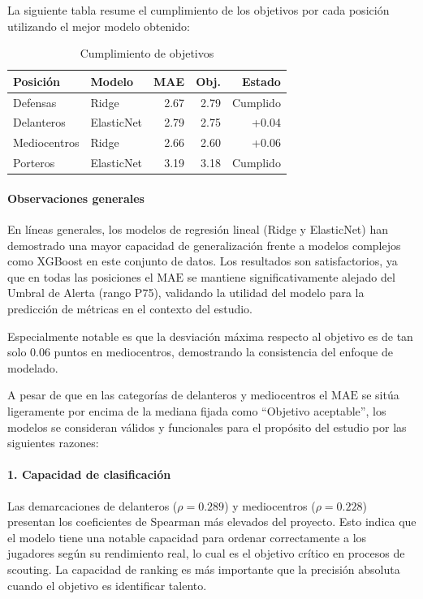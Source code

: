 La siguiente tabla resume el cumplimiento de los objetivos por 
cada posición utilizando el mejor modelo obtenido:

\begin{table}[H]
\centering
\small
\begin{tabular}{|l|l|r|r|r|}
\hline
\textbf{Posición} & \textbf{Modelo} & \textbf{MAE} & 
\textbf{Obj.} & \textbf{Estado} \\
\hline
Defensas & Ridge & 2.67 & 2.79 & Cumplido \\
Delanteros & ElasticNet & 2.79 & 2.75 & +0.04 \\
Mediocentros & Ridge & 2.66 & 2.60 & +0.06 \\
Porteros & ElasticNet & 3.19 & 3.18 & Cumplido \\
\hline
\end{tabular}
\caption{Cumplimiento de objetivos}
\end{table}


\paragraph{Observaciones generales}

En líneas generales, los modelos de regresión lineal (Ridge y 
ElasticNet) han demostrado una mayor capacidad de generalización 
frente a modelos complejos como XGBoost en este conjunto de datos. 
Los resultados son satisfactorios, ya que en todas las posiciones 
el $\mathrm{MAE}$ se mantiene significativamente alejado 
del Umbral de Alerta (rango P75), validando la utilidad del 
modelo para la predicción de métricas en el contexto del estudio.

Especialmente notable es que la desviación máxima respecto al 
objetivo es de tan solo 0.06 puntos en mediocentros, demostrando 
la consistencia del enfoque de modelado.

A pesar de que en las categorías de delanteros y mediocentros el 
$\mathrm{MAE}$ se sitúa ligeramente por encima de la mediana fijada 
como ``Objetivo aceptable'', los modelos se consideran 
válidos y funcionales para el propósito del estudio por 
las siguientes razones:

\paragraph{1. Capacidad de clasificación}

Las demarcaciones de delanteros ($\rho = 0.289$) y mediocentros 
($\rho = 0.228$) presentan los coeficientes de Spearman más 
elevados del proyecto. Esto indica que el modelo tiene una 
notable capacidad para ordenar correctamente a los 
jugadores según su rendimiento real, lo cual es el objetivo 
crítico en procesos de scouting. La capacidad de ranking es más 
importante que la precisión absoluta cuando el objetivo es 
identificar talento.


